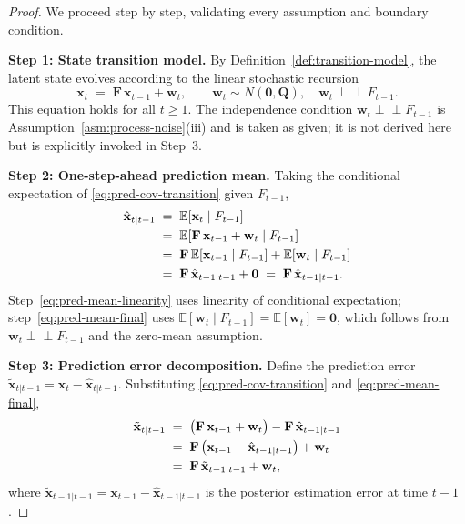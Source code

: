\documentclass[12pt,openany]{book}
\numberwithin{equation}{chapter}
\theoremstyle{plain}
\theoremstyle{definition}
\theoremstyle{remark}
\def\mathcal#1{#1}%
\begin{document}
\begin{proof}
We proceed step by step, validating every assumption and
boundary condition.

\medskip
\noindent\textbf{Step 1: State transition model.}
By Definition~\ref{def:transition-model}, the latent state
evolves according to the linear stochastic recursion
\begin{equation}
  \mathbf{x}_t
  \;=\;
  \mathbf{F}\,\mathbf{x}_{t-1}
  + \mathbf{w}_t,
  \qquad
  \mathbf{w}_t \sim \mathcal{N}(\mathbf{0}, \mathbf{Q}),
  \quad
  \mathbf{w}_t \perp\!\!\!\perp \mathcal{F}_{t-1}.
  \label{eq:pred-cov-transition}
\end{equation}
This equation holds for all $t \geq 1$.  The independence
condition $\mathbf{w}_t \perp\!\!\!\perp \mathcal{F}_{t-1}$
is Assumption~\ref{asm:process-noise}(iii) and is taken as
given; it is not derived here but is explicitly invoked in
Step~3.

\medskip
\noindent\textbf{Step 2: One-step-ahead prediction mean.}
Taking the conditional expectation of
\eqref{eq:pred-cov-transition} given $\mathcal{F}_{t-1}$,
\begin{align}
  \hat{\mathbf{x}}_{t|t-1}
  &\;=\;
  \mathbb{E}[\mathbf{x}_t \mid \mathcal{F}_{t-1}]
  \notag \\
  &\;=\;
  \mathbb{E}[\mathbf{F}\,\mathbf{x}_{t-1}
             + \mathbf{w}_t \mid \mathcal{F}_{t-1}]
  \label{eq:pred-mean-expand} \\
  &\;=\;
  \mathbf{F}\,\mathbb{E}[\mathbf{x}_{t-1} \mid \mathcal{F}_{t-1}]
  + \mathbb{E}[\mathbf{w}_t \mid \mathcal{F}_{t-1}]
  \label{eq:pred-mean-linearity} \\
  &\;=\;
  \mathbf{F}\,\hat{\mathbf{x}}_{t-1|t-1}
  + \mathbf{0}
  \;=\;
  \mathbf{F}\,\hat{\mathbf{x}}_{t-1|t-1}.
  \label{eq:pred-mean-final}
\end{align}
Step~\eqref{eq:pred-mean-linearity} uses linearity of
conditional expectation; step~\eqref{eq:pred-mean-final}
uses $\mathbb{E}[\mathbf{w}_t \mid \mathcal{F}_{t-1}]
= \mathbb{E}[\mathbf{w}_t] = \mathbf{0}$, which follows
from $\mathbf{w}_t \perp\!\!\!\perp \mathcal{F}_{t-1}$ and
the zero-mean assumption.

\medskip
\noindent\textbf{Step 3: Prediction error decomposition.}
Define the prediction error
$\tilde{\mathbf{x}}_{t|t-1}
 = \mathbf{x}_t - \hat{\mathbf{x}}_{t|t-1}$.
Substituting \eqref{eq:pred-cov-transition} and
\eqref{eq:pred-mean-final},
\begin{align}
  \tilde{\mathbf{x}}_{t|t-1}
  &\;=\;
  \bigl(\mathbf{F}\,\mathbf{x}_{t-1} + \mathbf{w}_t\bigr)
  - \mathbf{F}\,\hat{\mathbf{x}}_{t-1|t-1}
  \notag \\
  &\;=\;
  \mathbf{F}\,\bigl(\mathbf{x}_{t-1}
                    - \hat{\mathbf{x}}_{t-1|t-1}\bigr)
  + \mathbf{w}_t
  \notag \\
  &\;=\;
  \mathbf{F}\,\tilde{\mathbf{x}}_{t-1|t-1}
  + \mathbf{w}_t,
  \label{eq:pred-error-decomp}
\end{align}
where $\tilde{\mathbf{x}}_{t-1|t-1}
= \mathbf{x}_{t-1} - \hat{\mathbf{x}}_{t-1|t-1}$
is the posterior estimation error at time $t-1$.


\end{proof}
\end{document}
